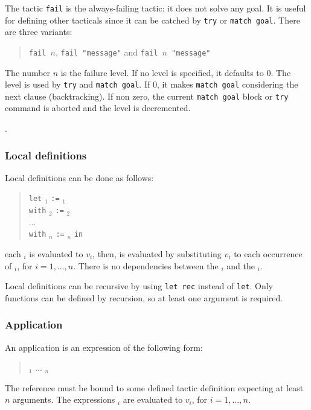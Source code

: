 The tactic {\tt fail} is the always-failing tactic: it does not solve
any goal. It is useful for defining other tacticals since it can be
catched by {\tt try} or {\tt match goal}. There are three variants:
\begin{quote}
{\tt fail $n$}, {\tt fail "message"} and {\tt fail $n$ "message"}
\end{quote}
The number $n$ is the failure level. If no level is specified, it
defaults to $0$.  The level is used by {\tt try} and {\tt match goal}.
If $0$, it makes {\tt match goal} considering the next clause
(backtracking). If non zero, the current {\tt match goal} block or
{\tt try} command is aborted and the level is decremented.

\ErrMsg {}.

\subsubsection{Local definitions}

Local definitions can be done as follows:
\begin{quote}
{\tt let} {\ident}$_1$ {\tt :=} {\tacexpr}$_1$\\
{\tt with} {\ident}$_2$ {\tt :=} {\tacexpr}$_2$\\
...\\
{\tt with} {\ident}$_n$ {\tt :=} {\tacexpr}$_n$ {\tt in}\\
{\tacexpr}
\end{quote}
each {\tacexpr}$_i$ is evaluated to $v_i$, then, {\tacexpr} is
evaluated by substituting $v_i$ to each occurrence of {\ident}$_i$,
for $i=1,...,n$. There is no dependencies between the {\tacexpr}$_i$
and the {\ident}$_i$.

Local definitions can be recursive by using {\tt let rec} instead of
{\tt let}. Only functions can be defined by recursion, so at least one
argument is required.

\subsubsection{Application}

An application is an expression of the following form:
\begin{quote}
{\qualid} {\tacarg}$_1$ ... {\tacarg}$_n$
\end{quote}
The reference {\qualid} must be bound to some defined tactic
definition expecting at least $n$ arguments.  The expressions
{\tacexpr}$_i$ are evaluated to $v_i$, for $i=1,...,n$.

